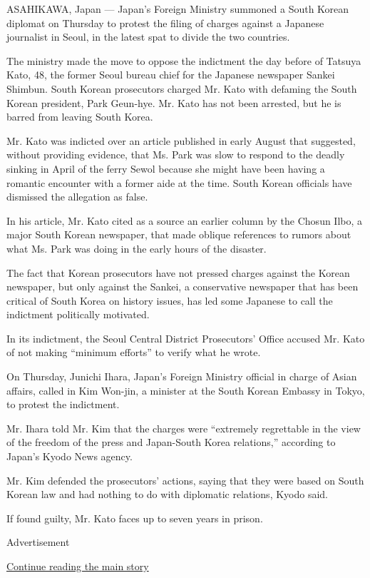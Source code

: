 ASAHIKAWA, Japan --- Japan's Foreign Ministry summoned a South Korean
diplomat on Thursday to protest the filing of charges against a Japanese
journalist in Seoul, in the latest spat to divide the two countries.

The ministry made the move to oppose the indictment the day before of
Tatsuya Kato, 48, the former Seoul bureau chief for the Japanese
newspaper Sankei Shimbun. South Korean prosecutors charged Mr. Kato with
defaming the South Korean president, Park Geun-hye. Mr. Kato has not
been arrested, but he is barred from leaving South Korea.

Mr. Kato was indicted over an article published in early August that
suggested, without providing evidence, that Ms. Park was slow to respond
to the deadly sinking in April of the ferry Sewol because she might have
been having a romantic encounter with a former aide at the time. South
Korean officials have dismissed the allegation as false.

In his article, Mr. Kato cited as a source an earlier column by the
Chosun Ilbo, a major South Korean newspaper, that made oblique
references to rumors about what Ms. Park was doing in the early hours of
the disaster.

The fact that Korean prosecutors have not pressed charges against the
Korean newspaper, but only against the Sankei, a conservative newspaper
that has been critical of South Korea on history issues, has led some
Japanese to call the indictment politically motivated.

In its indictment, the Seoul Central District Prosecutors' Office
accused Mr. Kato of not making ``minimum efforts'' to verify what he
wrote.

On Thursday, Junichi Ihara, Japan's Foreign Ministry official in charge
of Asian affairs, called in Kim Won-jin, a minister at the South Korean
Embassy in Tokyo, to protest the indictment.

Mr. Ihara told Mr. Kim that the charges were ``extremely regrettable in
the view of the freedom of the press and Japan-South Korea relations,''
according to Japan's Kyodo News agency.

Mr. Kim defended the prosecutors' actions, saying that they were based
on South Korean law and had nothing to do with diplomatic relations,
Kyodo said.

If found guilty, Mr. Kato faces up to seven years in prison.

Advertisement

\protect\hyperlink{after-bottom}{Continue reading the main story}

